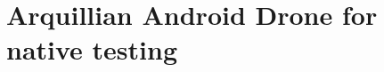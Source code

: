 \documentclass[12pt,final,oneside]{fithesis}
\begin{document}
	\section{Arquillian Android Drone for native testing}


\printindex

%
%

\appendix
\end{document}
